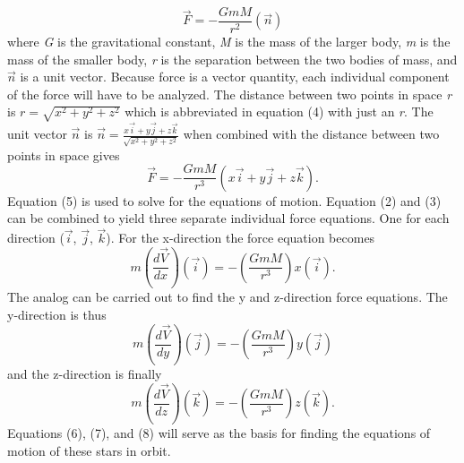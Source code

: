\documentclass[]{article}
\begin{document}
\begin{multicols}{2}
\begin{equation}
\Vec{F}=-\frac{GmM}{r^2} (\Vec{n})
\end{equation}
where \textit{G} is the gravitational constant, \textit{M} is the mass of the larger body, \textit{m} is the mass of the smaller body, \textit{r} is the separation between the two bodies of mass, and $\Vec{n}$ is a unit vector. Because force is a vector quantity, each individual component of the force will have to be analyzed. The distance between two points in space \textit{r} is $\textit{r}=\sqrt{x^2+y^2+z^2}$ which is abbreviated in equation (4) with just an \textit{r}. The unit vector $\Vec{n}$ is  $\Vec{n}=\frac{x\Vec{i}+y\Vec{j}+z\Vec{k}}{\sqrt{x^2+y^2+z^2}}$ when combined with the distance between two points in space gives
\begin{equation}\label{5}
\Vec{F}=-\frac{GmM}{r^3}(x\Vec{i}+y\Vec{j}+z\Vec{k}).
\end{equation}
Equation (5) is used to solve for the equations of motion. Equation (2) and (3) can be combined to yield three separate individual force equations. One for each direction ($\Vec{i}$, $\Vec{j}$, $\Vec{k}$). For the x-direction the force equation becomes
\begin{equation}\label{6}
m(\frac{d\Vec{V}}{dx})(\Vec{i})=-(\frac{GmM}{r^3})x(\Vec{i}).
\end{equation}
The analog can be carried out to find the y and z-direction force equations. The y-direction is thus
\begin{equation}\label{7}
m(\frac{d\Vec{V}}{dy})(\Vec{j})=-(\frac{GmM}{r^3})y(\Vec{j})
\end{equation}
and the z-direction is finally
\begin{equation}\label{8}
m(\frac{d\Vec{V}}{dz})(\Vec{k})=-(\frac{GmM}{r^3})z(\Vec{k}).
\end{equation}
Equations (6), (7), and (8) will serve as the basis for finding the equations of motion of these stars in orbit. 
\par
\end{multicols}
\end{document}
